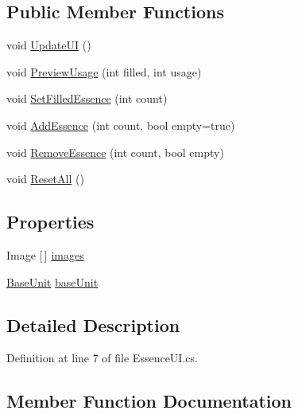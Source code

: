 \subsection*{Public Member Functions}
\begin{DoxyCompactItemize}
\item 
void \mbox{\hyperlink{class_essence_u_i_a26023c3d4977188014384a1a40eb3ad9}{Update\+UI}} ()
\item 
void \mbox{\hyperlink{class_essence_u_i_abe39202e5f4c5134bd6a16ddfd8bb017}{Preview\+Usage}} (int filled, int usage)
\item 
void \mbox{\hyperlink{class_essence_u_i_aac12f1c82310ceb94e259d9b6aa9bdfd}{Set\+Filled\+Essence}} (int count)
\item 
void \mbox{\hyperlink{class_essence_u_i_a1fd3a11e5b47cd87758d337fe1f61384}{Add\+Essence}} (int count, bool empty=true)
\item 
void \mbox{\hyperlink{class_essence_u_i_a39b3c1ec97a29130e2e8ab4050921ed6}{Remove\+Essence}} (int count, bool empty)
\item 
void \mbox{\hyperlink{class_essence_u_i_a82a6c20070b4fd052eae20ba6e05487b}{Reset\+All}} ()
\end{DoxyCompactItemize}
\subsection*{Properties}
\begin{DoxyCompactItemize}
\item 
Image \mbox{[}$\,$\mbox{]} \mbox{\hyperlink{class_essence_u_i_a08b6afcc69283f73676b25f7d3faea16}{images}}
\item 
\mbox{\hyperlink{class_base_unit}{Base\+Unit}} \mbox{\hyperlink{class_essence_u_i_aa0f4e2e07a1b90d6656dbbbf34a459fe}{base\+Unit}}
\end{DoxyCompactItemize}


\subsection{Detailed Description}


Definition at line 7 of file Essence\+U\+I.\+cs.



\subsection{Member Function Documentation}
\mbox{\label{class_essence_u_i_a1fd3a11e5b47cd87758d337fe1f61384}} 
